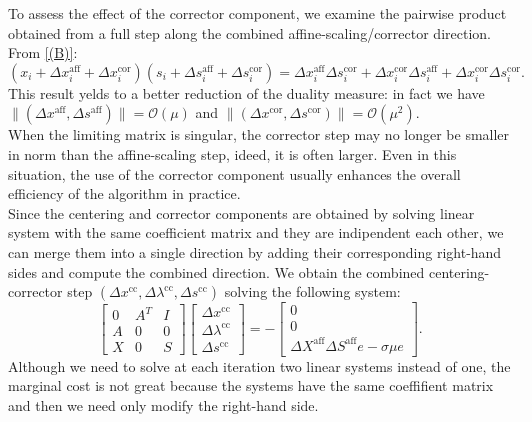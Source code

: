 \documentclass[a4paper,10 pt,titlepage,twoside]{book}
\theoremstyle{plain}
\theoremstyle{definition}
\theoremstyle{remark}
\begin{document}
To assess the effect of the corrector component, we examine the pairwise product obtained from a full step along the combined affine-scaling/corrector direction. From \ref{(B)}:
\begin{equation*}
(x_{i}+\Delta x_{i}^{\text{aff}}+\Delta x_{i}^{\text{cor}})(s_{i}+\Delta s_{i}^{\text{aff}}+\Delta s_{i}^{\text{cor}})= \Delta x_{i}^{\text{aff}}\Delta s_{i}^{\text{cor}}+\Delta x_{i}^{\text{cor}}\Delta s_{i}^{\text{aff}}+\Delta x_{i}^{\text{cor}}\Delta s_{i}^{\text{cor}}.
\end{equation*}
This result yelds to a better reduction of the duality measure: in fact we have \\$\lVert(\Delta x^{\text{aff}},\Delta s^{\text{aff}}) \rVert = \mathcal{O}(\mu)$ and $\lVert(\Delta x^{\text{cor}},\Delta s^{\text{cor}}) \rVert = \mathcal{O}(\mu^{2})$.
\\
When the limiting matrix is singular, the corrector step may no longer be smaller in norm than the affine-scaling step, ideed, it is often larger. Even in this situation, the use of the corrector component usually enhances the overall efficiency of the algorithm in practice.\\
Since the centering and corrector components are obtained by solving linear system with the same coefficient matrix and they are indipendent each other, we can merge them into a single direction by adding their corresponding right-hand sides and compute the combined direction. 
We obtain the combined centering-corrector step $(\Delta x^{\text{cc}}, \Delta \lambda^{\text{cc}}, \Delta s^{\text{cc}})$ solving the following system:
\begin{equation}\label{(C)}
\begin{bmatrix}
0&A^{T}&I \\A&0&0\\X&0&S
\end{bmatrix}\begin{bmatrix}
\Delta x^{\text{cc}}\\\Delta\lambda^{\text{cc}} \\\Delta s^{\text{cc}}
\end{bmatrix}=-\begin{bmatrix}
0\\0\\\Delta X^{\text{aff}}\Delta S^{\text{aff}}e - \sigma\mu e
\end{bmatrix}.
\end{equation}
Although we need to solve at each iteration two linear systems instead of one, the marginal cost is not great because the systems have the same coeffifient matrix and then we need only modify the right-hand side. \\
\end{document}
